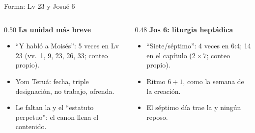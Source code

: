 \begin{frame}{Forma: Lv 23 y Josué 6}
\begin{columns}[t,onlytextwidth]
\begin{column}{0.50\textwidth}\small\RaggedRight
\textbf{\textcolor{tierraroja}{La unidad más breve}}
\begin{itemize}
\item ``Y habló \SENOR{} a Moisés'': 5 veces en Lv 23 (vv.~1, 9, 23, 26, 33; conteo propio).
\item Yom Teruá: fecha, triple designación, no trabajo, ofrenda.
\item Le faltan la  y el ``estatuto perpetuo'': el canon llena el contenido.
\end{itemize}
\end{column}
\begin{column}{0.48\textwidth}\small\RaggedRight
\textbf{\textcolor{tierraroja}{Jos 6: liturgia heptádica}}
\begin{itemize}
\item ``Siete/séptimo'': 4 veces en 6:4; 14 en el capítulo ($2\times7$; conteo propio).
\item Ritmo $6+1$, como la semana de la creación.
\item El séptimo día trae la  y ningún reposo.
\end{itemize}
\end{column}
\end{columns}
\end{frame}

